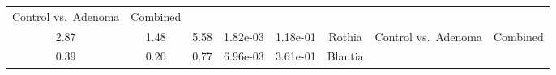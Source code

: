 \documentclass[12pt,]{article}
\begin{document}
\begin{longtable}[]{@{}cccccccc@{}}
\begin{minipage}[t]{0.14\columnwidth}
Control vs.~Adenoma\strut
\end{minipage} & \begin{minipage}[t]{0.09\columnwidth}\centering\strut
Combined\strut
\end{minipage}\tabularnewline
\begin{minipage}[t]{0.05\columnwidth}\centering\strut
2.87\strut
\end{minipage} & \begin{minipage}[t]{0.09\columnwidth}\centering\strut
1.48\strut
\end{minipage} & \begin{minipage}[t]{0.09\columnwidth}\centering\strut
5.58\strut
\end{minipage} & \begin{minipage}[t]{0.07\columnwidth}\centering\strut
1.82e-03\strut
\end{minipage} & \begin{minipage}[t]{0.07\columnwidth}\centering\strut
1.18e-01\strut
\end{minipage} & \begin{minipage}[t]{0.20\columnwidth}\centering\strut
Rothia\strut
\end{minipage} & \begin{minipage}[t]{0.14\columnwidth}\centering\strut
Control vs.~Adenoma\strut
\end{minipage} & \begin{minipage}[t]{0.09\columnwidth}\centering\strut
Combined\strut
\end{minipage}\tabularnewline
\begin{minipage}[t]{0.05\columnwidth}\centering\strut
0.39\strut
\end{minipage} & \begin{minipage}[t]{0.09\columnwidth}\centering\strut
0.20\strut
\end{minipage} & \begin{minipage}[t]{0.09\columnwidth}\centering\strut
0.77\strut
\end{minipage} & \begin{minipage}[t]{0.07\columnwidth}\centering\strut
6.96e-03\strut
\end{minipage} & \begin{minipage}[t]{0.07\columnwidth}\centering\strut
3.61e-01\strut
\end{minipage} & \begin{minipage}[t]{0.20\columnwidth}\centering\strut
Blautia\strut
\end{minipage} & \begin{minipage}[t]{0.14\columnwidth}\centering\strut

\end{minipage}
\end{longtable}
\end{document}
